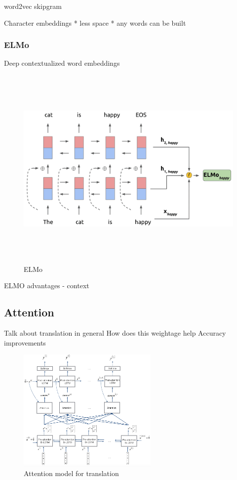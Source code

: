 \documentclass[a4paper, 11pt]{article}
\begin{document}
word2vec skipgram

Character embeddings
* less space
* any words can be built


\parencite{mikolov2013linguistic}


\subsubsection{ELMo}

Deep contextualized word embeddings

\parencite{peters2018deep}

\begin{figure}[htpb]
    \centering
    \includegraphics[width=\textwidth,height=10cm,keepaspectratio=true]
    {elmo.png}
    \caption{
        ELMo
    }
    \label{fig:ELMO}
\end{figure}

ELMO advantages - context

\subsection{Attention}

Talk about translation in general
How does this weightage help
Accuracy improvements
\parencite{bahdanau2014neural}

\begin{figure}[H]
    \centering
    \includegraphics[width=\textwidth,height=6cm,keepaspectratio=true]
    {attention-model-1.png}
    \caption{
        Attention model for translation
    }
    \label{fig:attention_model}
\end{figure}
\end{document}
